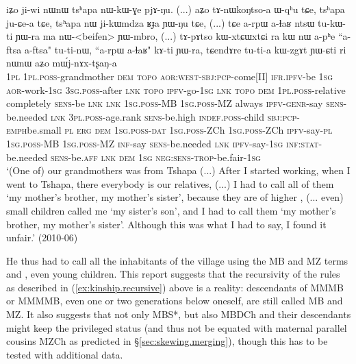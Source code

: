  \begin{exe}
\ex \label{ex:aftsa.beifen}
\gll  iʑo ji-wi nɯnɯ tsʰapa nɯ-kɯ-ɣe pjɤ-ŋu. (...)   aʑo tɤ-nɯkoŋtso-a ɯ-qʰu tɕe, tsʰapa ju-ɕe-a tɕe, tsʰapa nɯ ji-kɯmdza ʁɟa ɲɯ-ŋu tɕe, (...) tɕe a-rpɯ a-ɬaʁ ntsɯ tu-kɯ-ti ɲɯ-ra ma nɯ-<beifen> ɲɯ-mbro, (...)   tɤ-pɤtso kɯ-xtɕɯ\redp{}xtɕi ra kɯ nɯ a-pʰe ``a-ftsa a-ftsa" tu-ti-nɯ, ``a-rpɯ a-ɬaʁ" kɤ-ti ɲɯ-ra, tɕendɤre tu-ti-a kɯ-zgɤt ɲɯ-ɕti ri nɯnɯ aʑo mɯ́j-nɤx-tʂaŋ-a   \\
\textsc{1pl} \textsc{1pl}.\textsc{poss}-grandmother \textsc{dem}  \textsc{topo} \textsc{aor}:\textsc{west}-\textsc{sbj}:\textsc{pcp}-come[II] \textsc{ifr}.\textsc{ipfv}-be { } \textsc{1sg} \textsc{aor}-work-\textsc{1sg} \textsc{3sg}.\textsc{poss}-after \textsc{lnk}  \textsc{topo} \textsc{ipfv}-go-\textsc{1sg} \textsc{lnk}  \textsc{topo} \textsc{dem} \textsc{1pl}.\textsc{poss}-relative completely \textsc{sens}-be \textsc{lnk} { } \textsc{lnk} \textsc{1sg}.\textsc{poss}-MB \textsc{1sg}.\textsc{poss}-MZ always \textsc{ipfv}-\textsc{genr}-say \textsc{sens}-be.needed \textsc{lnk} \textsc{3pl}.\textsc{poss}-age.rank \textsc{sens}-be.high {  } \textsc{indef}.\textsc{poss}-child \textsc{sbj}:\textsc{pcp}-\textsc{emph}\redp{}be.small \textsc{pl} \textsc{erg} \textsc{dem}  \textsc{1sg}.\textsc{poss}-\textsc{dat}  \textsc{1sg}.\textsc{poss}-ZCh  \textsc{1sg}.\textsc{poss}-ZCh \textsc{ipfv}-say-\textsc{pl}  \textsc{1sg}.\textsc{poss}-MB \textsc{1sg}.\textsc{poss}-MZ \textsc{inf}-say \textsc{sens}-be.needed \textsc{lnk} \textsc{ipfv}-say-\textsc{1sg} \textsc{inf}:\textsc{stat}-be.needed \textsc{sens}-be.\textsc{aff} \textsc{lnk} \textsc{dem} \textsc{1sg} \textsc{neg}:\textsc{sens}-\textsc{trop}-be.fair-\textsc{1sg} \\
\glt `(One of) our grandmothers was from Tshapa (...) After I started working, when I went to Tshapa, there everybody is our relatives, (...) I had to call all of them `my mother's brother, my mother's sister', because they are of higher , (... even) small children called me `my sister's son', and I had to call them  `my mother's brother, my mother's sister'. Although this was what I had to say, I found it unfair.' (2010-06)
 \end{exe}
 
He thus had to call all the inhabitants of the village using the MB  and MZ  terms   and , even young children. This report suggests that the recursivity of the rules as described in (\ref{ex:kinship.recursive}) above is a reality: descendants of MMMB or MMMMB, even one or two generations below oneself, are still called MB and MZ. It also suggests that not only MBS*, but also MBDCh and their descendants might keep the privileged status (and thus not be equated with maternal parallel cousins MZCh as predicted in §\ref{sec:skewing.merging}), though this has to be tested with additional data.


